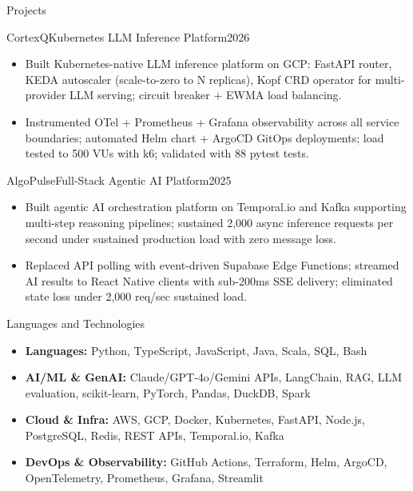 \documentclass[]{mcdowellcv}
\begin{document}
\begin{cvsection}{Projects}
  \begin{cvsubsection}{CortexQ}{Kubernetes LLM Inference Platform}{2026}
    \begin{itemize}
      \item Built Kubernetes-native LLM inference platform on GCP: FastAPI router, KEDA autoscaler (scale-to-zero to N replicas), Kopf CRD operator for multi-provider LLM serving; circuit breaker + EWMA load balancing.
      \item Instrumented OTel + Prometheus + Grafana observability across all service boundaries; automated Helm chart + ArgoCD GitOps deployments; load tested to 500 VUs with k6; validated with 88 pytest tests.
    \end{itemize}
    \vspace{-1.5pt}
  \end{cvsubsection}

  \begin{cvsubsection}{AlgoPulse}{Full-Stack Agentic AI Platform}{2025}
    \begin{itemize}
      \item Built agentic AI orchestration platform on Temporal.io and Kafka supporting multi-step reasoning pipelines; sustained 2,000 async inference requests per second under sustained production load with zero message loss.
      \item Replaced API polling with event-driven Supabase Edge Functions; streamed AI results to React Native clients with sub-200ms SSE delivery; eliminated state loss under 2,000 req/sec sustained load.
    \end{itemize}
  \end{cvsubsection}
\end{cvsection}

\begin{cvsection}{Languages and Technologies}
  \begin{cvsubsection}{}{}{}
    \begin{itemize}
      \item \textbf{Languages:} Python, TypeScript, JavaScript, Java, Scala, SQL, Bash
      \item \textbf{AI/ML \& GenAI:} Claude/GPT-4o/Gemini APIs, LangChain, RAG, LLM evaluation, scikit-learn, PyTorch, Pandas, DuckDB, Spark
      \item \textbf{Cloud \& Infra:} AWS, GCP, Docker, Kubernetes, FastAPI, Node.js, PostgreSQL, Redis, REST APIs, Temporal.io, Kafka
      \item \textbf{DevOps \& Observability:} GitHub Actions, Terraform, Helm, ArgoCD, OpenTelemetry, Prometheus, Grafana, Streamlit
    \end{itemize}
  \end{cvsubsection}
\end{cvsection}
\end{document}
